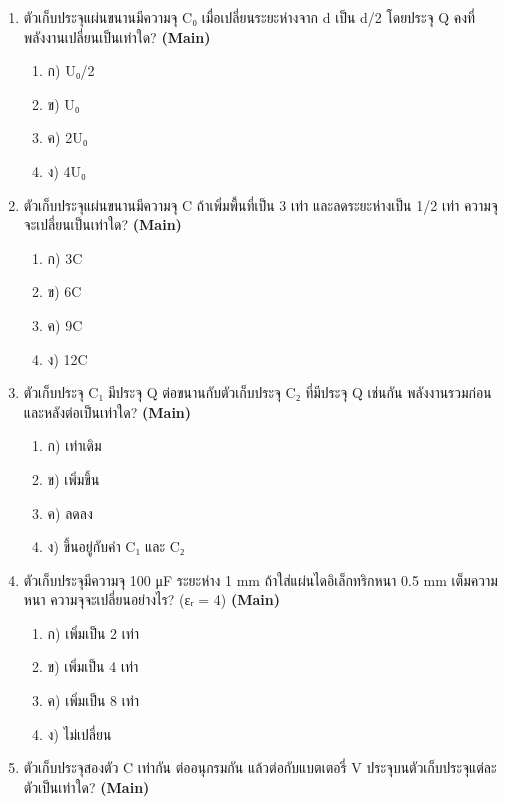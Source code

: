 \documentclass[12pt]{article}
\begin{document}
\begin{enumerate}[label=\arabic*.]
\begin{enumerate}[label=)]
\item ก) 2 เท่า
\item ข) 3 เท่า
\item ค) 4 เท่า
\item ง) 8 เท่า
\end{enumerate}
\item ตัวเก็บประจุแผ่นขนานมีความจุ C₀ เมื่อเปลี่ยนระยะห่างจาก d เป็น d/2 โดยประจุ Q คงที่ พลังงานเปลี่ยนเป็นเท่าใด? \hfill \textbf{\small (Main)}
\begin{enumerate}[label=)]
\item ก) U₀/2
\item ข) U₀
\item ค) 2U₀
\item ง) 4U₀
\end{enumerate}
\item ตัวเก็บประจุแผ่นขนานมีความจุ C ถ้าเพิ่มพื้นที่เป็น 3 เท่า และลดระยะห่างเป็น 1/2 เท่า ความจุจะเปลี่ยนเป็นเท่าใด? \hfill \textbf{\small (Main)}
\begin{enumerate}[label=)]
\item ก) 3C
\item ข) 6C
\item ค) 9C
\item ง) 12C
\end{enumerate}
\item ตัวเก็บประจุ C₁ มีประจุ Q ต่อขนานกับตัวเก็บประจุ C₂ ที่มีประจุ Q เช่นกัน พลังงานรวมก่อนและหลังต่อเป็นเท่าใด? \hfill \textbf{\small (Main)}
\begin{enumerate}[label=)]
\item ก) เท่าเดิม
\item ข) เพิ่มขึ้น
\item ค) ลดลง
\item ง) ขึ้นอยู่กับค่า C₁ และ C₂
\end{enumerate}
\item ตัวเก็บประจุมีความจุ 100 μF ระยะห่าง 1 mm ถ้าใส่แผ่นไดอิเล็กทริกหนา 0.5 mm เต็มความหนา ความจุจะเปลี่ยนอย่างไร? (εᵣ = 4) \hfill \textbf{\small (Main)}
\begin{enumerate}[label=)]
\item ก) เพิ่มเป็น 2 เท่า
\item ข) เพิ่มเป็น 4 เท่า
\item ค) เพิ่มเป็น 8 เท่า
\item ง) ไม่เปลี่ยน
\end{enumerate}
\item ตัวเก็บประจุสองตัว C เท่ากัน ต่ออนุกรมกัน แล้วต่อกับแบตเตอรี่ V ประจุบนตัวเก็บประจุแต่ละตัวเป็นเท่าใด? \hfill \textbf{\small (Main)}

\end{enumerate}
\end{document}
